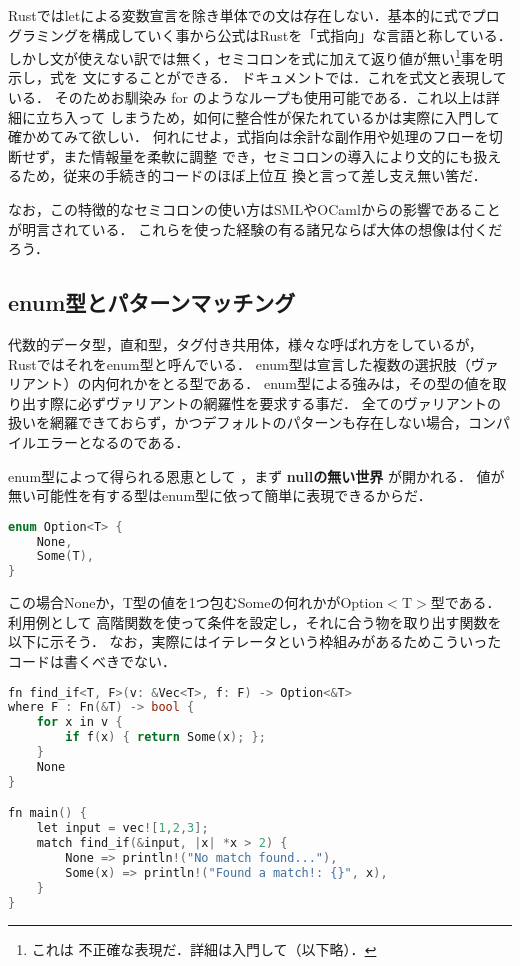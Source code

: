 Rustではletによる変数宣言を除き単体での文は存在しない．基本的に式でプログラミングを構成していく事から公式はRustを「式指向」な言語と称している．
しかし文が使えない訳では無く，セミコロンを式に加えて返り値が無い\footnote{これは
  不正確な表現だ．詳細は入門して（以下略）．}事を明示し，式を
文にすることができる．
ドキュメントでは．これを式文と表現している．
そのためお馴染み for のようなループも使用可能である．これ以上は詳細に立ち入って
しまうため，如何に整合性が保たれているかは実際に入門して確かめてみて欲しい．
何れにせよ，式指向は余計な副作用や処理のフローを切断せず，また情報量を柔軟に調整
でき，セミコロンの導入により文的にも扱えるため，従来の手続き的コードのほぼ上位互
換と言って差し支え無い筈だ．

なお，この特徴的なセミコロンの使い方はSMLやOCamlからの影響であることが明言されている．
これらを使った経験の有る諸兄ならば大体の想像は付くだろう．

\subsection{enum型とパターンマッチング}
代数的データ型，直和型，タグ付き共用体，様々な呼ばれ方をしているが，
Rustではそれをenum型と呼んでいる．
enum型は宣言した複数の選択肢（ヴァリアント）の内何れかをとる型である．
enum型による強みは，その型の値を取り出す際に必ずヴァリアントの網羅性を要求する事だ．
全てのヴァリアントの扱いを網羅できておらず，かつデフォルトのパターンも存在しない場合，コンパイルエラーとなるのである．

enum型によって得られる恩恵として
，まず \textbf{nullの無い世界} が開かれる．
値が無い可能性を有する型はenum型に依って簡単に表現できるからだ．

\begin{lstlisting}[language={C++},caption=Option型,label=option_t]
enum Option<T> {
    None,
    Some(T),
}
\end{lstlisting}

この場合Noneか，T型の値を1つ包むSomeの何れかがOption$<$T$>$型である．
利用例として
高階関数を使って条件を設定し，それに合う物を取り出す関数を以下に示そう．
なお，実際にはイテレータという枠組みがあるためこういったコードは書くべきでない．

\begin{lstlisting}[language={C++},caption=条件に応じた値が見つかれば返す関数,label=find_if]
fn find_if<T, F>(v: &Vec<T>, f: F) -> Option<&T>
where F : Fn(&T) -> bool {
    for x in v {
        if f(x) { return Some(x); };
    }
    None
}

fn main() {
    let input = vec![1,2,3];
    match find_if(&input, |x| *x > 2) {
        None => println!("No match found..."),
        Some(x) => println!("Found a match!: {}", x),
    }
}
\end{lstlisting}

